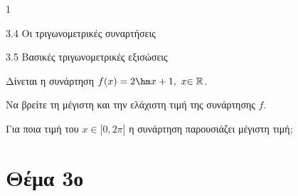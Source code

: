\begin{ylh}{1}
\item 3.4 Οι τριγωνομετρικές συναρτήσεις
\item 3.5 Βασικές τριγωνομετρικές εξισώσεις
\end{ylh}
Δίνεται η συνάρτηση $f(x) = 2\hm  x + 1,\ x\mathbb{\in R}$.
\begin{alist}
\item Να βρείτε τη μέγιστη και την ελάχιστη τιμή της συνάρτησης $f$.
\item Για ποια τιμή του $x \in \lbrack 0,2\pi\rbrack$ η συνάρτηση παρουσιάζει μέγιστη τιμή;
\end{alist}
\section{Θέμα 3ο}


